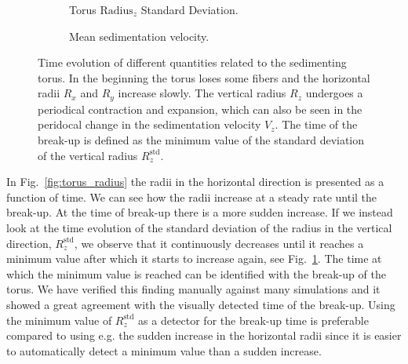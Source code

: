 \begin{figure}[htbp]
\begin{subfigure}[h]{.48\textwidth}
    \caption{Torus $\text{Radius}_z$ Standard Deviation.}\label{fig:torus_deviation}
  \end{subfigure}
  \begin{subfigure}[h]{.48\textwidth}
    \caption{Mean sedimentation velocity.}\label{fig:torus_velocity}
  \end{subfigure}
  \caption[Time evolution of the sedimenting torus.]{Time evolution of different quantities related to the sedimenting torus. In the beginning the torus loses some fibers and the horizontal radii $R_x$ and $R_y$ increase slowly. The vertical radius $R_z$ undergoes a periodical contraction and expansion, which can also be seen in the peridocal change in the sedimentation velocity $V_z$. The time of the break-up is defined as the minimum value of the standard deviation of the vertical radius $R_z^{\text{std}}$.}
  \label{fig:torus}
\end{figure}

In Fig.~\ref{fig:torus_radius} the radii in the horizontal direction is presented as a function of time. We can see how the radii increase at a steady rate until the break-up. At the time of break-up there is a more sudden increase. If we instead look at the time evolution of the standard deviation of the radius in the vertical direction, $R_z^{\text{std}}$, we observe that it continuously decreases until it reaches a minimum value after which it starts to increase again, see Fig.~\ref{fig:torus_deviation}. The time at which the minimum value is reached can be identified with the break-up of the torus. We have verified this finding manually against many simulations and it showed a great agreement with the visually detected time of the break-up. Using the minimum value of $R_z^{\text{std}}$ as a detector for the break-up time is preferable compared to using e.g. the sudden increase in the horizontal radii since it is easier to automatically detect a minimum value than a sudden increase.

